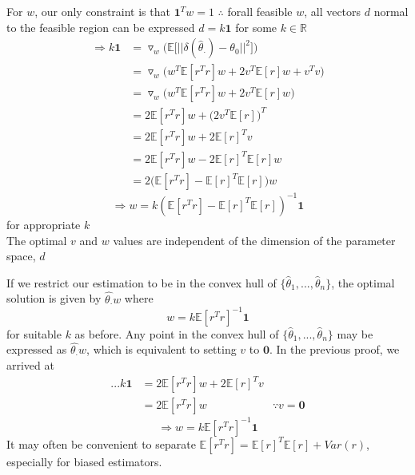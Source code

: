 \documentclass{article}
\begin{document}
For $w$, our only constraint is that $\mathbf{1}^Tw = 1$ $\therefore$ forall feasible $w$, all vectors $d$ normal to the feasible region can be expressed $d = k\mathbf{1}$ for some $k \in \mathbb{R}$ \\
\begin{align*}
\Rightarrow k \mathbf{1} &= \triangledown_w \bigg(\mathbb{E}\big[||\delta(\hat{\theta}_\cdot) - \theta_0||^2\big]\bigg)
\\&= \triangledown_w \Big(w^T\mathbb{E}[r^Tr]w + 2v^T\mathbb{E}[r]w+ v^Tv\Big)
\\&= \triangledown_w \Big(w^T\mathbb{E}[r^Tr]w + 2v^T\mathbb{E}[r]w\Big)
\\&= 2\mathbb{E}[r^Tr]w + \big(2v^T\mathbb{E}[r]\big)^T
\\&= 2\mathbb{E}[r^Tr]w + 2\mathbb{E}[r]^Tv
\\&= 2\mathbb{E}[r^Tr]w - 2\mathbb{E}[r]^T\mathbb{E}[r]w
\\&= 2\big(\mathbb{E}[r^Tr] - \mathbb{E}[r]^T\mathbb{E}[r]\big)w
\end{align*}
\[ \Rightarrow w = k(\mathbb{E}[r^Tr] - \mathbb{E}[r]^T\mathbb{E}[r])^{-1}\mathbf{1} \]
for appropriate $k$ \\
\remark The optimal $v$ and $w$ values are independent of the dimension of the parameter space, $d$

\corollary If we restrict our estimation to be in the convex hull of $\{\hat{\theta}_1,...,\hat{\theta}_n\}$, the optimal solution is given by $\hat{\theta_\cdot}w$ where
\[ w = k\mathbb{E}[r^Tr]^{-1}\mathbf{1} \]
for suitable $k$ as before.
\proof Any point in the convex hull of $\{\hat{\theta}_1,...,\hat{\theta}_n\}$ may be expressed as $\hat{\theta_\cdot}w$, which is equivalent to setting $v$ to $\mathbf{0}$. In the previous proof, we arrived at
\begin{align*}
...k\mathbf{1} &= 2\mathbb{E}[r^Tr]w + 2\mathbb{E}[r]^Tv
\\&= 2\mathbb{E}[r^Tr]w &\because v=\mathbf{0}
\end{align*}
\[ \Rightarrow w = k\mathbb{E}[r^Tr]^{-1}\mathbf{1} \]
\remark It may often be convenient to separate $\mathbb{E}[r^Tr] = \mathbb{E}[r]^T\mathbb{E}[r] + Var(r)$, especially for biased estimators.
\end{document}
